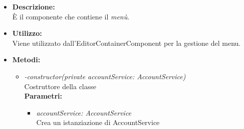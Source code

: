 \begin{itemize}
	\item \textbf{Descrizione:}\\
	È il componente che contiene il \textit{menù}.
	\item \textbf{Utilizzo:}\\
	Viene utilizzato dall'EditorContainerComponent per la gestione del menu.
		\item \textbf{Metodi:}
		\begin{itemize}
			\item \emph{-constructor(private accountService: AccountService)}\\
    		Costruttore della classe\\
    		\textbf{Parametri:}
    		\begin{itemize}
    			\item \emph{accountService: AccountService}\\
    			Crea un istanziazione di AccountService
    		\end{itemize}
		\end{itemize}
\end{itemize}
